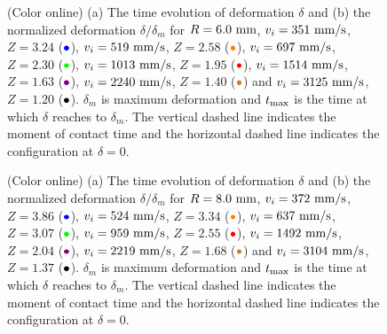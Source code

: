 \documentclass[aps,prl,superscriptaddress]{revtex4}  %
\begin{document}
%
%
\begin{figure}[h!]
 \caption{(Color online) (a) The time evolution of deformation $\delta$ and (b) the normalized deformation $\delta/ \delta_m$ for $R = 6.0 ~{\rm mm}$, $v_i = 351~{\rm mm/s}$, $Z = 3.24$ ($\textcolor{blue}{\bullet}$),  $v_i = 519~{\rm mm/s}$, $Z = 2.58$  ($\textcolor{orange}{\bullet}$), $v_i = 697~{\rm mm/s}$, $Z = 2.30$ ($\textcolor{green}{\bullet}$), $v_i =1013 ~{\rm mm/s}$, $Z = 1.95$ ($\textcolor{red}{\bullet}$), $v_i =1514 ~{\rm mm/s}$, $Z =1.63 $ ($\textcolor{violet}{\bullet}$), $v_i =2240~{\rm mm/s}$, $Z =1.40$ ($\textcolor{brown}{\bullet}$) and $v_i = 3125~{\rm mm/s}$, $Z =1.20$ ($\textcolor{black}{\bullet}$). $\delta_m$ is maximum deformation and $t_{ {\rm max}}$ is the time at which $\delta$ reaches to $\delta_m$. The vertical dashed line indicates the moment of contact time and the horizontal dashed line indicates the configuration at $\delta = 0$. \label{fig:FS8} }
\end{figure}
%
%
\begin{figure}[h!]
 \caption{(Color online) (a) The time evolution of deformation $\delta$ and (b) the normalized deformation $\delta/ \delta_m$ for $R = 8.0 ~{\rm mm}$, $v_i = 372~{\rm mm/s}$, $Z = 3.86$ ($\textcolor{blue}{\bullet}$),  $v_i = 524~{\rm mm/s}$, $Z = 3.34$  ($\textcolor{orange}{\bullet}$), $v_i = 637~{\rm mm/s}$, $Z = 3.07$ ($\textcolor{green}{\bullet}$), $v_i =959 ~{\rm mm/s}$, $Z = 2.55$ ($\textcolor{red}{\bullet}$), $v_i =1492 ~{\rm mm/s}$, $Z =2.04 $ ($\textcolor{violet}{\bullet}$), $v_i =2219~{\rm mm/s}$, $Z =1.68 $ ($\textcolor{brown}{\bullet}$) and $v_i = 3104~{\rm mm/s}$, $Z =1.37$ ($\textcolor{black}{\bullet}$). $\delta_m$ is maximum deformation and $t_{ {\rm max}}$ is the time at which $\delta$ reaches to $\delta_m$. The vertical dashed line indicates the moment of contact time and the horizontal dashed line indicates the configuration at $\delta = 0$. \label{fig:FS8} }
\end{figure}
%
\end{document}
